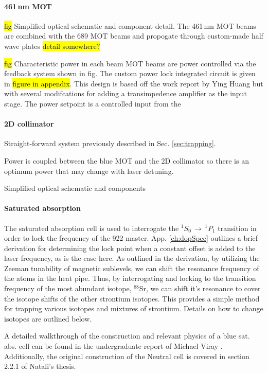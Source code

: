 \paragraph{461\,nm MOT}

\hl{fig} Simplified optical schematic and component detail.
The 461\,nm MOT beams are combined with the 689 MOT beams and propogate through custom-made half wave plates \hl{detail somewhere?}

\hl{fig}
Characteristic power in each beam
MOT beams are power controlled via the feedback system shown in fig.
The custom power lock integrated circuit is given in \hl{figure in appendix}.
This design is based off the work report by Ying Huang but with several modifcations for adding a transimpedence amplifier as the input stage.
The power setpoint is a controlled input from the 

\paragraph{2D collimator}
Straight-forward system previously described in Sec. \ref{sec:trapping}.

Power is coupled between the blue MOT and the 2D collimator so there is an optimum power that may change with laser detuning. 

Simplified optical schematic and components
	

\paragraph{Saturated absorption}
The saturated absorption cell is used to interrogate the $^1S_0\,\rightarrow\,^1P_1$ transition in order to lock the frequency of the 922 master.
App. \ref{ch:dopSpec} outlines a brief derivation for determining the lock point when a constant offset is added to the laser frequency, as is the case here.
As outlined in the derivation, by utilizing the Zeeman tunability of magnetic sublevels, we can shift the resonance frequency of the atoms in the heat pipe.
Thus, by interrogating and locking to the transition frequency of the most abundant isotope, $^{88}$Sr, we can shift it's resonance to cover the isotope shifts of the other strontium isotopes.
This provides a simple method for trapping various isotopes and mixtures of strontium.
Details on how to change isotopes are outlined below.

A detailed walkthrough of the construction and relevant physics of a blue sat. abs. cell can be found in the undergraduate report of Michael Viray \cite{MichaelViray2014}.
Additionally, the original construction of the Neutral cell is covered in section 2.2.1 of Natali's thesis.

